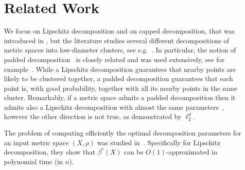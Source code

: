 \section{Related Work}
\label{sec:related}

%
We focus on Lipschitz decomposition and on capped decomposition,
that was introduced in \cite{FN22}, 
but the literature studies several different decompositions of metric spaces
into low-diameter clusters, see e.g.~\cite{MN07, Filtser24}.
In particular, the notion of padded decomposition~\cite{Rao99, KL07}
is closely related and was used extensively,
see for example~\cite{Rao99, Bartal04, LN03draft, MN07, KLMN05}.
%
While a Lipschitz decomposition guarantees that nearby points are likely to be clustered together,
a padded decomposition guarantees that each point is, with good probability,
together with all its nearby points in the same cluster.
%
Remarkably, if a metric space admits a padded decomposition then it admits
also a Lipschitz decomposition with almost the same parameters~\cite{LN03draft},
however the other direction is not true, as demonstrated by $\ell_2^d$.
%


%
The problem of computing efficiently the optimal decomposition parameters
for an input metric space $(X,\rho)$ was studied in~\cite{KR11}.
Specifically for Lipschitz decomposition, %
they show that $\beta^*(X)$ can be $O(1)$-approximated in polynomial time (in $n$).